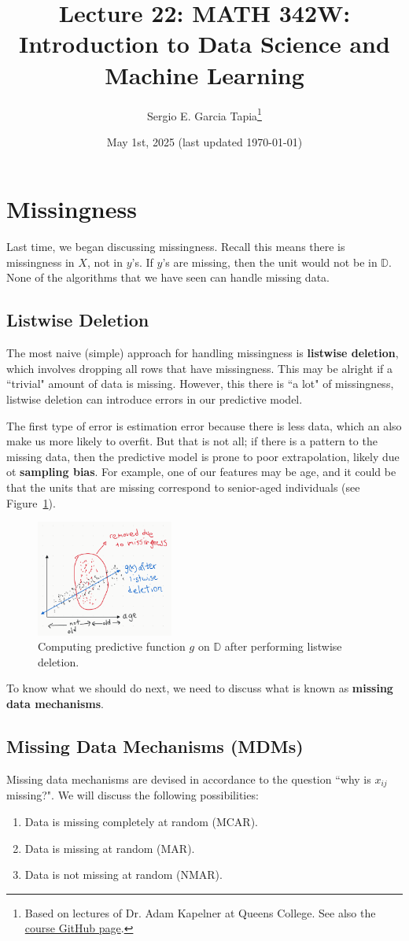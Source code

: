 \documentclass[12pt, a4paper]{article}
\title{Lecture 22: MATH 342W: Introduction to Data Science and Machine Learning}
\author{Sergio E. Garcia Tapia\thanks{Based on lectures of Dr. Adam Kapelner at Queens College.
See also the \href{https://github.com/kapelner/QC_MATH_342W_Spring_2025}{course GitHub page}.}}
\date{May 1st, 2025 (last updated \today)}
\theoremstyle{definition}
\begin{document}
	\maketitle
	\section{Missingness}
	Last time, we began discussing missingness. Recall this means there is
	missingness in $X$, not in $y$'s. If $y$'s are missing, then the unit would
	not be in $\mathbb{D}$. None of the algorithms that we have seen can handle
	missing data.
	
	\subsection{Listwise Deletion}
	The most naive (simple) approach for handling missingness is \textbf{listwise deletion},
	which involves dropping all rows that have missingness. This may be alright if
	a ``trivial" amount of data is missing. However, this there is ``a lot" of missingness,
	listwise deletion can introduce errors in our predictive model.
	
	The first type of error is estimation error because there is less data,
	which an also make us more likely to overfit. But that is not all; if
	there is a pattern to the missing data, then the predictive model is
	prone to poor extrapolation, likely due ot \textbf{sampling bias}.
	For example, one of our features may be age, and it could be that the
	units that are missing correspond to senior-aged individuals
	(see Figure~\ref{fig:model-after-listwise-deletion}).
	\begin{figure}
		\centering
		\includegraphics[width=0.4\textwidth]{model-after-listwise-deletion}
		\caption{Computing predictive function $g$ on $\mathbb{D}$ after
		performing listwise deletion.}
		\label{fig:model-after-listwise-deletion}
	\end{figure}
	To know what we should do next, we need to discuss what is known as
	\textbf{missing data mechanisms}.
	\subsection{Missing Data Mechanisms (MDMs)}
	Missing data mechanisms are devised in accordance to the question ``why is $x_{ij}$
	missing?". We will discuss the following possibilities:
	\begin{enumerate}[label=(\arabic*)]
		\item Data is missing completely at random (MCAR).
		\item Data is missing at random (MAR).
		\item Data is not missing at random (NMAR).
	\end{enumerate}
\end{document}
